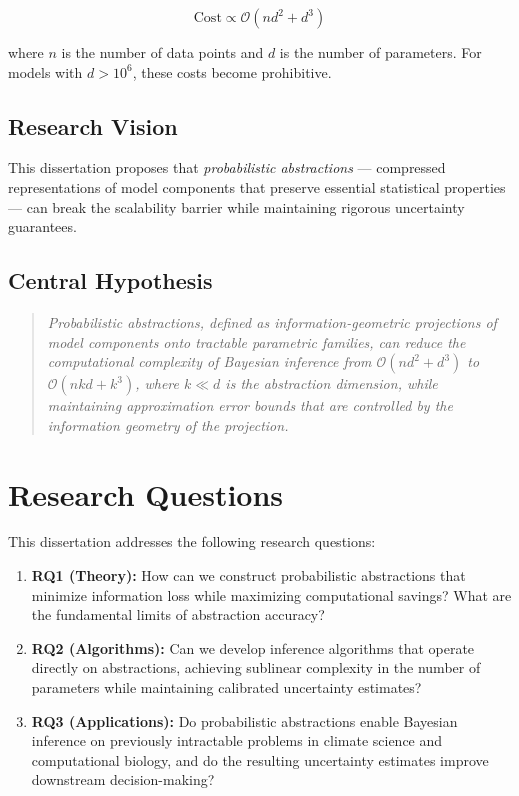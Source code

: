 \documentclass[
    language=english,
    doctype=dissertation-proposal,
    institution=none,
]{../../omnilatex}
\begin{document}
\begin{equation}
    \text{Cost} \propto \mathcal{O}(nd^2 + d^3)
    \label{eq:bottleneck}
\end{equation}

where $n$ is the number of data points and $d$ is the number of parameters.
For models with $d > 10^6$, these costs become prohibitive.

\subsection{Research Vision}

This dissertation proposes that \textit{probabilistic abstractions} ---
compressed representations of model components that preserve essential
statistical properties --- can break the scalability barrier while
maintaining rigorous uncertainty guarantees.

\subsection{Central Hypothesis}

\begin{quote}
    \textit{Probabilistic abstractions, defined as information-geometric
    projections of model components onto tractable parametric families,
    can reduce the computational complexity of Bayesian inference from
    $\mathcal{O}(nd^2 + d^3)$ to $\mathcal{O}(nkd + k^3)$, where $k \ll d$
    is the abstraction dimension, while maintaining approximation error
    bounds that are controlled by the information geometry of the
    projection.}
\end{quote}

\section{Research Questions}
\label{sec:research-questions}

This dissertation addresses the following research questions:

\begin{enumerate}
    \item \textbf{RQ1 (Theory):} How can we construct probabilistic
          abstractions that minimize information loss while maximizing
          computational savings? What are the fundamental limits of
          abstraction accuracy?

    \item \textbf{RQ2 (Algorithms):} Can we develop inference algorithms
          that operate directly on abstractions, achieving sublinear
          complexity in the number of parameters while maintaining
          calibrated uncertainty estimates?

    \item \textbf{RQ3 (Applications):} Do probabilistic abstractions
          enable Bayesian inference on previously intractable problems
          in climate science and computational biology, and do the
          resulting uncertainty estimates improve downstream decision-making?
\end{enumerate}
\end{document}
